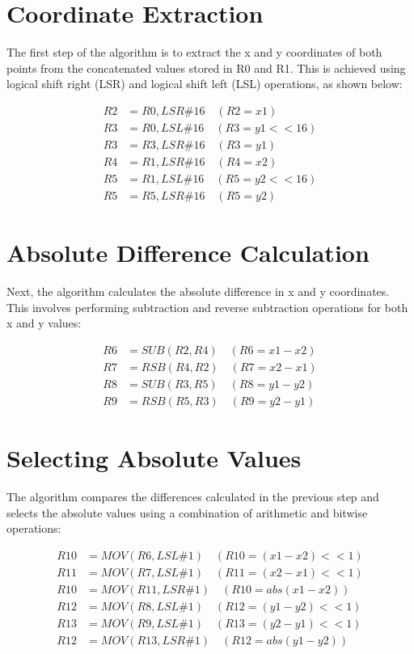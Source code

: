 \section{Coordinate Extraction}

The first step of the algorithm is to extract the x and y coordinates of both points from the concatenated values stored in R0 and R1. This is achieved using logical shift right (LSR) and logical shift left (LSL) operations, as shown below:

\begin{align}
R2 &= R0, LSR \# 16 \quad (R2 = x1) \\
R3 &= R0, LSL \# 16 \quad (R3 = y1 << 16) \\
R3 &= R3, LSR \# 16 \quad (R3 = y1) \\
R4 &= R1, LSR \# 16 \quad (R4 = x2) \\
R5 &= R1, LSL \# 16 \quad (R5 = y2 << 16) \\
R5 &= R5, LSR \# 16 \quad (R5 = y2)
\end{align}

\section{Absolute Difference Calculation}

Next, the algorithm calculates the absolute difference in x and y coordinates. This involves performing subtraction and reverse subtraction operations for both x and y values:

\begin{align}
R6 &= SUB(R2, R4) \quad (R6 = x1 - x2) \\
R7 &= RSB(R4, R2) \quad (R7 = x2 - x1) \\
R8 &= SUB(R3, R5) \quad (R8 = y1 - y2) \\
R9 &= RSB(R5, R3) \quad (R9 = y2 - y1)
\end{align}

\section{Selecting Absolute Values}

The algorithm compares the differences calculated in the previous step and selects the absolute values using a combination of arithmetic and bitwise operations:

\begin{align}
R10 &= MOV(R6, LSL \# 1) \quad (R10 = (x1 - x2) << 1) \\
R11 &= MOV(R7, LSL \# 1) \quad (R11 = (x2 - x1) << 1) \\
R10 &= MOV(R11, LSR \# 1) \quad (R10 = abs(x1 - x2)) \\
R12 &= MOV(R8, LSL \# 1) \quad (R12 = (y1 - y2) << 1) \\
R13 &= MOV(R9, LSL \# 1) \quad (R13 = (y2 - y1) << 1) \\
R12 &= MOV(R13, LSR \# 1) \quad (R12 = abs(y1 - y2))
\end{align}

